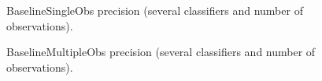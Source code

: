  \begin{figure}[h]
  \begin{subfigmatrix}{2}
  \end{subfigmatrix}
  \caption{BaselineSingleObs precision (several classifiers and number of observations).}
  \label{fig:baselinesingle}
\end{figure}

 \begin{figure}[h]
  \begin{subfigmatrix}{2}
  \end{subfigmatrix}
  \caption{BaselineMultipleObs precision (several classifiers and number of observations).}
  \label{fig:baselinemulti}
\end{figure}

